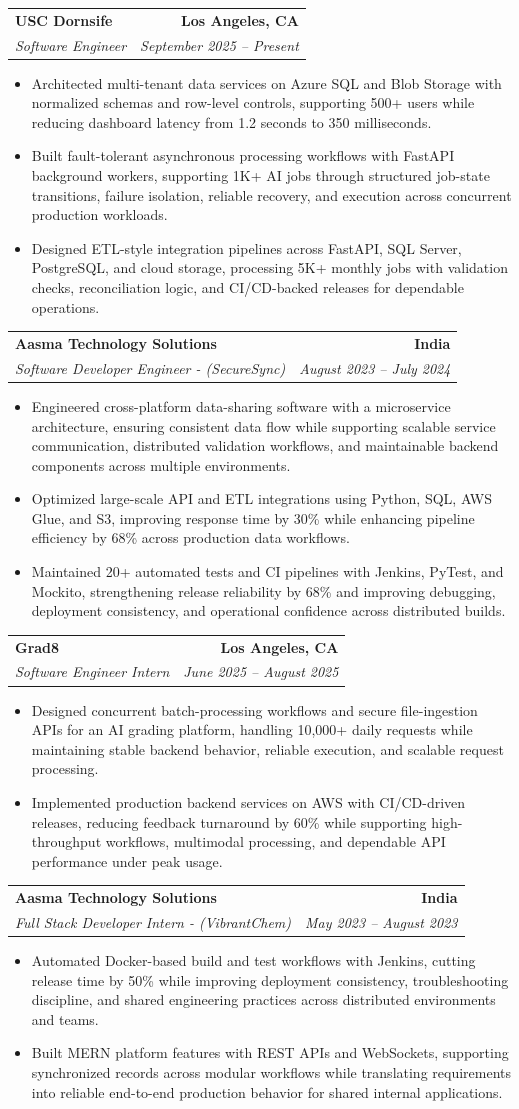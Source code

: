 \documentclass[letterpaper,10pt]{article}
\makeatletter
\newcommand{\resumeItem}[1]{\item\small{{#1 \vspace{-2pt}}}}
\newcommand{\resumeSubheading}[4]{\vspace{-1pt}\item\begin{tabular*}{1.0\textwidth}[t]{l@{\extracolsep{\fill}}r}\textbf{#1} & \textbf{\small #2} \\\textit{\small#3} & \textit{\small #4} \\\end{tabular*}\vspace{-2pt}}
\newcommand{\resumeItemListStart}{\begin{itemize}[leftmargin=0.15in,label=\textbullet,itemsep=2pt,topsep=0pt,parsep=0pt,partopsep=0pt]}
\newcommand{\resumeItemListEnd}{\end{itemize}\vspace{-4pt}}
\makeatother
\begin{document}
\resumeSubheading{USC Dornsife}{Los Angeles, CA}{Software Engineer}{September 2025 -- Present}
\resumeItemListStart
\resumeItem{Architected multi-tenant data services on Azure SQL and Blob Storage with normalized schemas and row-level controls, supporting 500+ users while reducing dashboard latency from 1.2 seconds to 350 milliseconds.}
\resumeItem{Built fault-tolerant asynchronous processing workflows with FastAPI background workers, supporting 1K+ AI jobs through structured job-state transitions, failure isolation, reliable recovery, and execution across concurrent production workloads.}
\resumeItem{Designed ETL-style integration pipelines across FastAPI, SQL Server, PostgreSQL, and cloud storage, processing 5K+ monthly jobs with validation checks, reconciliation logic, and CI/CD-backed releases for dependable operations.}
\resumeItemListEnd

\resumeSubheading{Aasma Technology Solutions}{India}{Software Developer Engineer - (SecureSync)}{August 2023 -- July 2024}
\resumeItemListStart
\resumeItem{Engineered cross-platform data-sharing software with a microservice architecture, ensuring consistent data flow while supporting scalable service communication, distributed validation workflows, and maintainable backend components across multiple environments.}
\resumeItem{Optimized large-scale API and ETL integrations using Python, SQL, AWS Glue, and S3, improving response time by 30\% while enhancing pipeline efficiency by 68\% across production data workflows.}
\resumeItem{Maintained 20+ automated tests and CI pipelines with Jenkins, PyTest, and Mockito, strengthening release reliability by 68\% and improving debugging, deployment consistency, and operational confidence across distributed builds.}
\resumeItemListEnd

\resumeSubheading{Grad8}{Los Angeles, CA}{Software Engineer Intern}{June 2025 -- August 2025}
\resumeItemListStart
\resumeItem{Designed concurrent batch-processing workflows and secure file-ingestion APIs for an AI grading platform, handling 10,000+ daily requests while maintaining stable backend behavior, reliable execution, and scalable request processing.}
\resumeItem{Implemented production backend services on AWS with CI/CD-driven releases, reducing feedback turnaround by 60\% while supporting high-throughput workflows, multimodal processing, and dependable API performance under peak usage.}
\resumeItemListEnd

\resumeSubheading{Aasma Technology Solutions}{India}{Full Stack Developer Intern - (VibrantChem)}{May 2023 -- August 2023}
\resumeItemListStart
\resumeItem{Automated Docker-based build and test workflows with Jenkins, cutting release time by 50\% while improving deployment consistency, troubleshooting discipline, and shared engineering practices across distributed environments and teams.}
\resumeItem{Built MERN platform features with REST APIs and WebSockets, supporting synchronized records across modular workflows while translating requirements into reliable end-to-end production behavior for shared internal applications.}
\resumeItemListEnd
\end{document}
